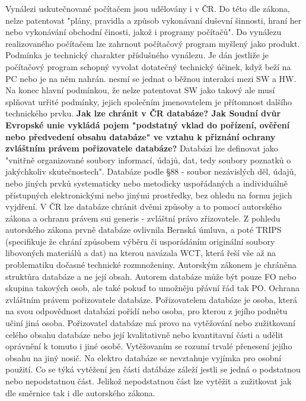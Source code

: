 \documentclass[12pt,a4paper,czech]{report}
\newcommand{\nadpis}[1]{\noindent\textbf{\Large{#1}}\normalsize}
\begin{document}
Vynálezi uskutečnované počítačem jsou udělovány i v ČR. Do této dle zákona, nelze patentovat "plány, pravidla a způsob vykonávaní duševní šinnosti, hraní her nebo vykonávání obchodní činosti, jakož i programy počítačů".
Do vynálezu realizovaného počítačem lze zahrnout počítačový program myšlený jako produkt. Podmínka je technický charakter příslušného vynálezu. Je dán jestliže je počítačový program schopný vyvolat dotatečný technický účinek, když beží na PC nebo je na něm nahrán. nesmí se jednat o běžnou interakci mezi SW a HW.  
Na konec hlavní podmínkou, že nelze patentovat SW jako takový ale musí splňovat urřité podmínky, jejich společním jmenovatelem je přítomnost dalšího technického prvku. 
\newline
\newline
\nadpis{Jak lze chránit v ČR databáze? Jak Soudní dvůr Evropské unie vykládá pojem "podstatný vklad do pořízení, ověření nebo předvedení obsahu databáze" ve vztahu k přiznání ochrany zvláštním právem pořizovatele databáze?}
\newline
\newline
Databázi lze definovat jako "vnitřně organizované soubory informací, údajů, dat, tedy soubory poznatků o jakýchkoliv skutečnostech".
Databáze podle §88 - soubor nezávislých děl, údajů, nebo jiných prvků systematicky nebo metodicky uspořádaných a individuálně přístupných elektronickými nebo jinými prostředky, bez ohledu na formu jejich vyjdření.
V ČR lze databáze chránit dvěmi způsoby a to pomocí autorského zákona a ochranu právem sui generis - zvláštní právo zřizovatele.
Z pohledu autorského zákona prvně databáze ovlivnila Bernská úmluva, a poté TRIPS (specifikuje že chrání způsobem výběru či usporádáním originální soubory libovoných materiálů a dat) na kterou navázala WCT, která řeší vše až na problematiku dočasné technické rozmnoženiny. Autorským zákonem je chráněna struktůra databáze a ne její obsah.
Autorem databáze může být pouze FO nebo skupina takových osob, ale také pokuď to umožněju přávní řád tak PO.
Ochrana zvláštním právem pořizovatele databáze. Pořizovatelem databáze je osoba, která na svou odpovědnost databázi pořídí nebo osoba, pro kterou z jejího podnětu učiní jiná osoba. Pořizovatel databáze má provo na vytěžování nebo zužitkovaní celého obsahu databáze nebo její kvalitativně nebo kvantitavní části a udělit oprávnění k tomuto i jiné osobě. Vytěžovaním se rozumí trvalé přenesení jejího obsahu na jiný nosič. Na elektro databáze se nevztahuje vyjímka pro osobní použití. Co se týká vytěžení jen části datábáze záleží jestli se jedná o podstatnou nebo nepodstatnou část. Jelikož nepodstatnou část lze vytěžit a zužitkovat jak dle směrnice tak i dle autorského zákona.
\end{document}
